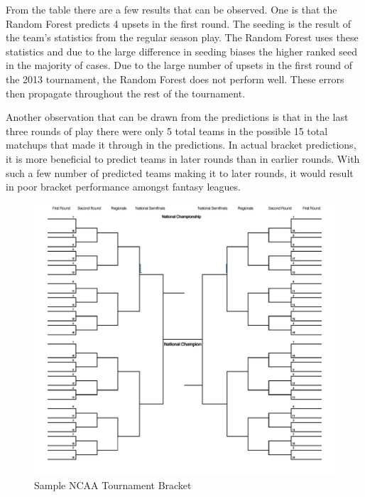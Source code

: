 \documentclass[conference]{IEEEtran}
\begin{document}
{From the table there are a few results that can be observed. 
One is that the Random Forest predicts 4 upsets in the first round. 
The seeding is the result of the team's statistics from the regular season play. 
The Random Forest uses these statistics and due to the large difference in seeding biases the higher ranked seed in the majority of cases. 
Due to the large number of upsets in the first round of the 2013 tournament, the Random Forest does not perform well. 
These errors then propagate throughout the rest of the tournament. 

Another observation that can be drawn from the predictions is that in the last three rounds of play there were only 5 total teams in the possible 15 total matchups that made it through in the predictions. 
In actual bracket predictions, it is more beneficial to predict teams in later rounds than in earlier rounds. 
With such a few number of predicted teams making it to later rounds, it would result in poor bracket performance amongst fantasy leagues.

\begin{figure}[H]
\centering
	\includegraphics[scale=.28]{bracket_blank.pdf}%
	\caption{Sample NCAA Tournament Bracket \cite{Andy-Soltis}}
	\label{bracket}
\end{figure}

}
\end{document}
